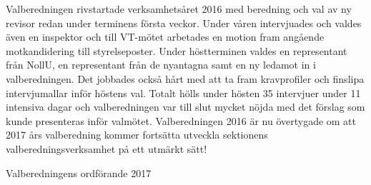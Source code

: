 \documentclass[../_main/handlingar.tex]{subfiles}
\begin{document}
Valberedningen rivstartade verksamhetsåret 2016 med beredning och val av ny revisor redan under terminens första veckor. Under våren intervjuades och valdes även en inspektor och till VT-mötet arbetades en motion fram angående motkandidering till styrelseposter. Under höstterminen valdes en representant från NollU, en representant från de nyantagna samt en ny ledamot in i valberedningen. Det jobbades också hårt med att ta fram kravprofiler och finslipa intervjumallar inför höstens val. Totalt hölls under hösten 35 intervjuer under 11 intensiva dagar och valberedningen var till slut mycket nöjda med det förslag som kunde presenteras inför valmötet.  Valberedningen 2016 är nu övertygade om att 2017 års valberedning kommer fortsätta utveckla sektionens valberedningsverksamhet på ett utmärkt sätt!


\begin{signatures}{1}
    \mvh
    \signature{Christian Benson}{Valberedningens ordförande 2017}
\end{signatures}
\end{document}
